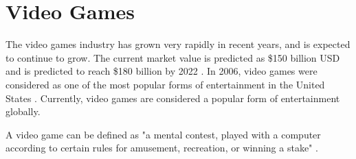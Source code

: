 \documentclass[a4paper,11.5pt]{report}
\numberwithin{figure}{section}
\numberwithin{table}{section}
\numberwithin{equation}{section}
\numberwithin{equation}{section}
\begin{document}
\section{Video Games}




The video games industry has grown very rapidly in recent years, and is expected to continue to grow. The current market value is predicted as \$150 billion USD and is predicted to reach \$180 billion by 2022 \citep{vgamesResearch}. In 2006, video games were considered as one of the most popular forms of entertainment in the United States \citep{sherry2006, ritterfeld2006}. Currently, video games are considered a popular form of entertainment globally.


A video game can be defined as "a mental contest, played with a computer according to certain rules for amusement, recreation, or winning a stake" \citep{Zyda2005}.




\end{document}
